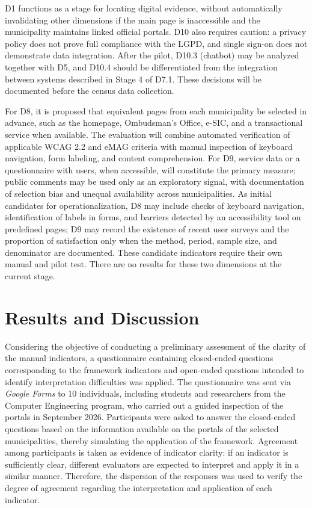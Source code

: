 \documentclass[12pt]{article}
\begin{document}
D1 functions as a stage for locating digital evidence, without automatically invalidating other dimensions if the main page is inaccessible and the municipality maintains linked official portals. D10 also requires caution: a privacy policy does not prove full compliance with the LGPD, and single sign-on does not demonstrate data integration. After the pilot, D10.3 (chatbot) may be analyzed together with D5, and D10.4 should be differentiated from the integration between systems described in Stage 4 of D7.1. These decisions will be documented before the census data collection.

For D8, it is proposed that equivalent pages from each municipality be selected in advance, such as the homepage, Ombudsman's Office, e-SIC, and a transactional service when available. The evaluation will combine automated verification of applicable WCAG 2.2 and eMAG criteria with manual inspection of keyboard navigation, form labeling, and content comprehension. For D9, service data or a questionnaire with users, when accessible, will constitute the primary measure; public comments may be used only as an exploratory signal, with documentation of selection bias and unequal availability across municipalities. As initial candidates for operationalization, D8 may include checks of keyboard navigation, identification of labels in forms, and barriers detected by an accessibility tool on predefined pages; D9 may record the existence of recent user surveys and the proportion of satisfaction only when the method, period, sample size, and denominator are documented. These candidate indicators require their own manual and pilot test. There are no results for these two dimensions at the current stage.
  
\section{Results and Discussion}

Considering the objective of conducting a preliminary assessment of the clarity of the manual indicators, a questionnaire containing closed-ended questions corresponding to the framework indicators and open-ended questions intended to identify interpretation difficulties was applied. The questionnaire was sent via \textit{Google Forms} to 10 individuals, including students and researchers from the Computer Engineering program, who carried out a guided inspection of the portals in September 2026. Participants were asked to answer the closed-ended questions based on the information available on the portals of the selected municipalities, thereby simulating the application of the framework. Agreement among participants is taken as evidence of indicator clarity: if an indicator is sufficiently clear, different evaluators are expected to interpret and apply it in a similar manner. Therefore, the dispersion of the responses was used to verify the degree of agreement regarding the interpretation and application of each indicator.
\end{document}
